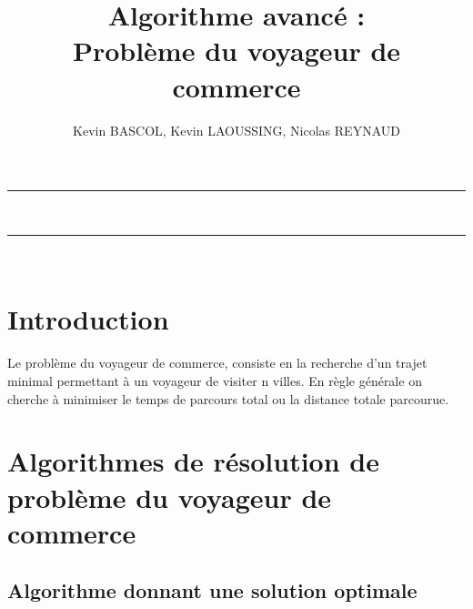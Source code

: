 \documentclass[10pt,a4paper]{report}
\author{Kevin BASCOL, Kevin LAOUSSING, Nicolas REYNAUD}
\title{Algorithme avancé : \\Problème du voyageur de commerce}
\begin{document}
\makeatletter
	\begin{titlepage}
	
	\begin{figure}
		\begin{minipage}[c]{.46\linewidth}
		\end{minipage} \hfill
		\begin{minipage}[c]{.20\linewidth}

		\end{minipage}
	\vspace{1cm}
	\end{figure}
	
	\centering
		{
		\hrule height 2pt
		\vspace{0.7cm}
		\Huge \textbf{\@title}}\\
		\vspace{0.7cm}
		\hrule height 2pt
		
		\vfill
		\vspace{1cm}
		\@author\\
		\end{titlepage}
\makeatother
\setcounter{secnumdepth}{5}
\setcounter{tocdepth}{5}
\renewcommand{\contentsname}{Sommaire}
\begingroup\makeatletter
\def\@makeschapterhead#1{%
  {\parindent \z@ \raggedright
    \normalfont
    \interlinepenalty\@M
    \Huge \bfseries  #1\par\nobreak
    \vskip 20pt%
  }}\makeatother
\tableofcontents
\endgroup
\thispagestyle{empty}
\setcounter{page}{0}
\newpage


\section{Introduction}
\begin{flushleft}
Le problème du voyageur de commerce, consiste en la recherche d'un trajet minimal permettant à un voyageur de visiter n villes. En règle générale on cherche à minimiser le temps de parcours total ou la distance totale parcourue.	
\end{flushleft}
\section{Algorithmes de résolution de problème du voyageur de commerce}

	\subsection{Algorithme donnant une solution optimale}
\end{document}
